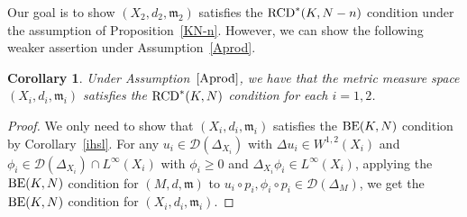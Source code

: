 \documentclass[pdftex]{sigma}
\numberwithin{equation}{section}
\newtheorem{Cor}[Thm]{Corollary}
\theoremstyle{definition}
\newcommand{\mf}{\mathfrak{m}}
\newcommand{\RCD}{{\rm RCD}^\ast}
\newcommand{\BE}{{\rm BE}}
\newcommand{\D}{\mathcal{D}}
\begin{document}
Our goal is to show $(X_2,d_2,\mf_2)$ satisfies the $\RCD(K,N-n)$ condition under the assumption of Proposition~\ref{KN-n}.
However, we can show the following weaker assertion under Assumption~\ref{Aprod}.
\begin{Cor}
Under Assumption~$\ref{Aprod}$, we have that the metric measure space $(X_i,d_i,\mf_i)$ satisfies the $\RCD(K,N)$ condition for each $i=1,2$.
\end{Cor}
\begin{proof}
We only need to show that $(X_i,d_i,\mf_i)$ satisfies the $\BE(K,N)$ condition by Corollary~\ref{ihsl}.
For any $u_i\in\D(\Delta_{X_i})$ with $\Delta u_i\in W^{1,2}(X_i)$ and $\phi_i\in\D(\Delta_{X_i})\cap L^\infty(X_i)$ with $\phi_i\geq 0$ and $\Delta_{X_i}\phi_i\in L^\infty(X_i)$, applying the $\BE(K,N)$ condition for $(M,d,\mf)$ to $u_i\circ p_i, \phi_i\circ p_i\in\D(\Delta_M)$, we get the $\BE(K,N)$ condition for $(X_i,d_i,\mf_i)$.
\end{proof}
\end{document}
